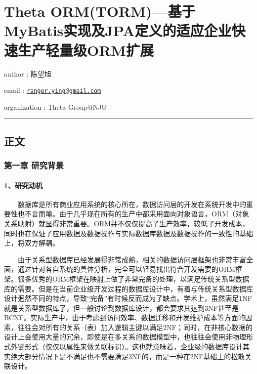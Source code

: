 \documentclass[]{article}
\date{}
\begin{document}
\section{Theta
ORM(TORM)---基于MyBatis实现及JPA定义的适应企业快速生产轻量级ORM扩展}\label{theta-ormtormux57faux4e8emybatisux5b9eux73b0ux53cajpaux5b9aux4e49ux7684ux9002ux5e94ux4f01ux4e1aux5febux901fux751fux4ea7ux8f7bux91cfux7ea7ormux6269ux5c55}

author : 陈望旭

email :
\href{mailto:ranger.ying@gmail.com}{\nolinkurl{ranger.ying@gmail.com}}

organization : Theta Group@NJU

\begin{center}\rule{0.5\linewidth}{\linethickness}\end{center}

\subsection{正文}\label{ux6b63ux6587}

\subsubsection{第一章
研究背景}\label{ux7b2cux4e00ux7ae0-ux7814ux7a76ux80ccux666f}

\paragraph{1、研究动机}\label{ux7814ux7a76ux52a8ux673a}

　　数据库是所有商业应用系统的核心所在，数据访问层的开发在系统开发中的重要性也不言而喻。由于几乎现在所有的生产中都采用面向对象语言，ORM（对象关系映射）就显得非常重要。ORM并不仅仅提高了生产效率，较低了开发成本，同时也在保证了应用数据及数据操作与实际数据库数据及数据操作的一致性的基础上，将双方解耦。

　　由于关系型数据库已经发展得非常成熟，相关的数据访问层框架也非常丰富全面，通过针对各自系统的具体分析，完全可以轻易找出符合开发需要的ORM框架。很多优秀的ORM框架在映射上做了非常完备的处理，以满足传统关系型数据库的需要。但是在当前企业级开发过程的数据库设计中，有着与传统关系型数据库设计迥然不同的特点，导致``完备''有时候反而成为了缺点。学术上，虽然满足1NF就是关系型数据库了，但一般讨论到数据库设计，都会要求其达到3NF甚至是BCNF。实际生产中，由于考虑到访问效率、数据迁移和开发维护成本等方面的因素，往往会对所有的关系（表）加入逻辑主键以满足2NF；同时，在非核心数据的设计上会使用大量的冗余，即使是在多关系的数据模型中，也往往会使用非物理形式外键形式（仅仅以属性来做关联标识）。这也就意味着，企业级的数据库设计其实绝大部分情况下是不满足也不需要满足3NF的，而是一种在2NF基础上的松散关联设计。
\end{document}
